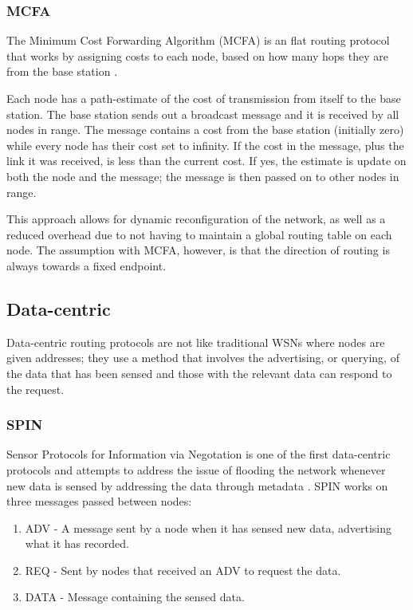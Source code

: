 \subsubsection{MCFA}
	The Minimum Cost Forwarding Algorithm (MCFA) is an flat routing protocol that works by assigning costs to each node, based on how many hops they are from the base station \cite{Chen2001}. 

Each node has a path-estimate of the cost of transmission from itself to the base station. The base station sends out a broadcast message and it is received by all nodes in range. The message contains a cost from the base station (initially zero) while every node has their cost set to infinity. If the cost in the message, plus the link it was received, is less than the current cost. If yes, the estimate is update on both the node and the message; the message is then passed on to other nodes in range. 

	This approach allows for dynamic reconfiguration of the network, as well as a reduced overhead due to not having to maintain a global routing table on each node. The assumption with MCFA, however, is that the direction of routing is always towards a fixed endpoint.

\subsection{Data-centric}
	Data-centric routing protocols are not like traditional WSNs where nodes are given addresses; they use a method that involves the advertising, or querying, of the data that has been sensed and those with the relevant data can respond to the request.

\subsubsection{SPIN}
	Sensor Protocols for Information via Negotation  is one of the first data-centric protocols and attempts to address the issue of flooding the network whenever new data is sensed by addressing the data through metadata \cite{Heinzelman1999}. SPIN works on three messages passed between nodes:
	\begin{enumerate}
		\item ADV - A message sent by a node when it has sensed new data, advertising what it has recorded.
		\item REQ - Sent by nodes that received an ADV to request the data.
		\item DATA - Message containing the sensed data.
	\end{enumerate}

